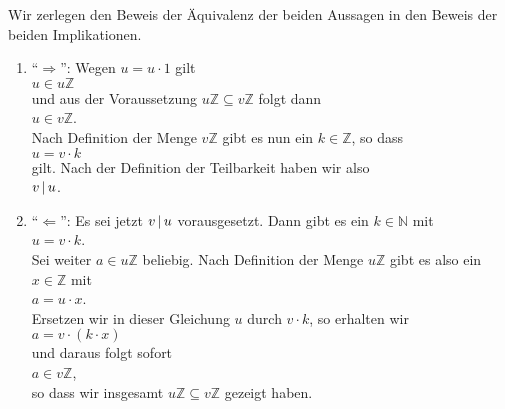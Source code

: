 \proof
Wir zerlegen den Beweis der \"{A}quivalenz der beiden Aussagen in den Beweis der beiden Implikationen.
\begin{enumerate}
\item ``$\Rightarrow$'': Wegen $u = u \cdot 1$ gilt  
      \\[0.2cm]
      \hspace*{1.3cm}
      $u \in u\mathbb{Z}$
      \\[0.2cm]
      und aus der Voraussetzung $u\mathbb{Z} \subseteq v\mathbb{Z}$ folgt dann
      \\[0.2cm]
      \hspace*{1.3cm}
      $u \in v\mathbb{Z}$.
      \\[0.2cm]
      Nach Definition der Menge $v\mathbb{Z}$ gibt es nun ein $k \in \mathbb{Z}$, so dass
      \\[0.2cm]
      \hspace*{1.3cm}
      $u = v \cdot k$
      \\[0.2cm]
      gilt.  Nach der Definition der Teilbarkeit haben wir also
      \\[0.2cm]
      \hspace*{1.3cm}
      $v \,|\, u$.
\item ``$\Leftarrow$'':  Es sei jetzt $v \,|\, u$ vorausgesetzt.  Dann gibt es ein $k \in \mathbb{N}$
      mit 
      \\[0.2cm]
      \hspace*{1.3cm}
      $u = v \cdot k$.
      \\[0.2cm]
      Sei weiter $a \in u\mathbb{Z}$ beliebig.  Nach Definition der Menge $u\mathbb{Z}$ gibt es also
      ein $x \in \mathbb{Z}$ mit
      \\[0.2cm]
      \hspace*{1.3cm}
      $a = u \cdot x$.
      \\[0.2cm]
      Ersetzen wir in dieser Gleichung $u$ durch $v \cdot k$, so erhalten wir
      \\[0.2cm]
      \hspace*{1.3cm}
      $a = v \cdot (k \cdot x)$
      \\[0.2cm]
      und daraus folgt sofort
      \\[0.2cm]
      \hspace*{1.3cm}
      $a \in v\mathbb{Z}$,
      \\[0.2cm]
      so dass wir insgesamt $u\mathbb{Z} \subseteq v\mathbb{Z}$ gezeigt haben.
\end{enumerate}

